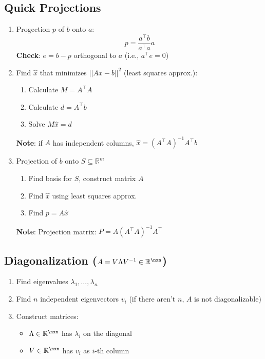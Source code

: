 \subsection{Quick Projections}
\begin{enumerate}
    \item Progection $p$ of $b$ onto $a$:
        $$p = \frac{a^\top b}{a^\top a} a$$
        \textbf{Check}: $e = b-p$ orthogonal to $a$ (i.e., $a^\top e = 0$)
    \item Find $\hat{x}$ that minimizes $||Ax - b||^2$ (least squares approx.):
        \begin{enumerate}
            \item Calculate $M = A^\top A$
            \item Calculate $d = A^\top b$
            \item Solve $M \hat{x} = d$
        \end{enumerate}
        \textbf{Note}: if $A$ has independent columns, $\hat{x} = (A^\top A)^{-1}A^\top b$
    \item Projection of $b$ onto $S \subseteq \mathbb{R}^m$
        \begin{enumerate}
            \item Find basis for $S$, construct matrix $A$
            \item Find $\hat{x}$ using least squares approx.
            \item Find $p = A\hat{x}$
        \end{enumerate}
        \textbf{Note}: Projection matrix: $P = A(A^\top A)^{-1}A^\top$
\end{enumerate}

\subsection{Diagonalization \texorpdfstring{($A = V \Lambda V^{-1} \in \mathbb{R}^{\nxn}$)}{}}
\begin{enumerate}
    \item Find eigenvalues $\lambda_1, \dots, \lambda_n$
    \item Find $n$ independent eigenvectors $v_i$ (if there aren't $n$, $A$ is not diagonalizable)
    \item Construct matrices:
        \begin{itemize}
            \item $\Lambda \in \mathbb{R}^{\nxn}$ has $\lambda_i$ on the diagonal
            \item $V \in \mathbb{R}^{\nxn}$ has $v_i$ as $i$-th column
        \end{itemize}
\end{enumerate}

